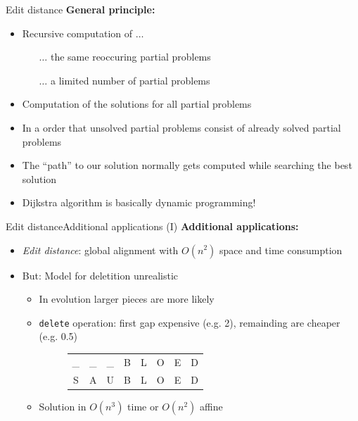 \begin{frame}{Edit distance}
  \textbf{General principle:}
  \begin{itemize}
    \item
      Recursive computation of $\ldots$
      \begin{itemize}
        \item[$\ldots$]
          the same reoccuring partial problems
        \item[$\ldots$]
          a limited number of partial problems
      \end{itemize}
    \item
      Computation of the solutions for all partial problems
    \item
      In a order that unsolved partial problems consist of already solved
      partial problems
    \item
      The \enquote{path} to our solution normally gets computed while searching
      the best solution
    \item
      Dijkstra algorithm is basically dynamic programming!
  \end{itemize}
\end{frame}


\begin{frame}{Edit distance}{Additional applications (I)}
  \textbf{Additional applications:}
  \begin{itemize}
    \item
      \textit{Edit distance}: global alignment with $O(n^2)$ space and time
      consumption
    \item
      But: Model for deletition unrealistic
      \begin{itemize}
        \item
          In evolution larger pieces are more likely
        \item
          \texttt{delete} operation: first gap expensive (e.g. 2),
          remainding are cheaper (e.g. 0.5)
          \begin{figure}[!h]
            \begin{tabular}{cccccccc}
              \_ & \_ & \_ & B & L & O & E & D\\
              S & A & U & B & L & O & E & D
            \end{tabular}
          \end{figure}
        \item
          Solution in $O(n^3)$ time or $O(n^2)$ affine
      \end{itemize}
  \end{itemize}
\end{frame}

